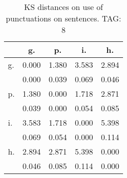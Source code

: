 \begin{table}[h!]
\begin{center}
\begin{tabular}{| l | c | c | c | c |}\hline
 & g. & p. & i. & h. \\\hline
g. & 0.000  & 1.380  & 3.583  & 2.894 \\\hline
 & 0.000  & 0.039  & 0.069  & 0.046 \\\hline
p. & 1.380  & 0.000  & 1.718  & 2.871 \\\hline
 & 0.039  & 0.000  & 0.054  & 0.085 \\\hline
i. & 3.583  & 1.718  & 0.000  & 5.398 \\\hline
 & 0.069  & 0.054  & 0.000  & 0.114 \\\hline
h. & 2.894  & 2.871  & 5.398  & 0.000 \\\hline
 & 0.046  & 0.085  & 0.114  & 0.000 \\\hline
\end{tabular}
\caption{KS distances on use of punctuations on sentences. TAG: 8}
\end{center}
\end{table}
